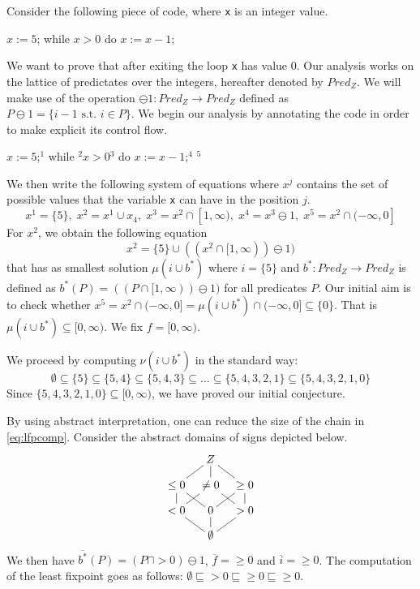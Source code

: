 \documentclass{llncs}
\begin{document}
Consider the following piece of code, where \texttt{x} is an integer value.
\begin{codeNT}
$x := 5$;  while $x>0$ do { $x:=x-1$; }
\end{codeNT}
We want to prove that after exiting the loop \texttt{x} has value $0$. Our analysis works on the lattice of predictates over the integers, hereafter denoted by $Pred_Z$. We will make use of the operation $\ominus 1 \colon Pred_Z \to Pred_Z$ defined as $P\ominus 1 = \{i-1 \text{ s.t. } i\in P  \}$. We begin our analysis by annotating the code in order to make explicit its control flow.
\begin{codeNT}
$x := 5$;$^{1}$  while $^{2}$$x>0$$^{3}$ do { $x:=x-1$;$^{4}$ }$^{5}$
\end{codeNT}
We then write the following system of equations where $x^j$ contains the set of possible values that the variable \texttt{x} can have in the position $j$.
\begin{equation}
x^1=\{5\},  \; x^2 = x^1\cup x_4, \; x^3 = x^2 \cap [1,\infty), \; x^4 = x^3 \ominus 1, \; x^5 = x^2 \cap (-\infty, 0]
\end{equation}
For $x^2$, we obtain the following equation
\begin{equation}
 x^2 = \{5\} \cup ( (x^2 \cap [1,\infty) ) \ominus 1 ) 
\end{equation}
that has as smallest solution $\mu (i \cup b^*)$ where $i=\{5\}$ and $b^*\colon Pred_Z \to Pred_Z$ is defined as $b^*(P) = ( (P\cap [1,\infty) ) \ominus 1 )$ for all predicates $P$. Our initial aim is to check whether $x^5 = x^2 \cap (-\infty, 0] = \mu (i \cup b^*)\cap (-\infty, 0]  \subseteq \{0\}$. That is $\mu (i \cup b^*)\subseteq [0,\infty)$. We fix $f = [0,\infty)$.

We proceed by computing $\nu (i \cup b^*)$ in the standard way:
\begin{equation}\label{eq:lfpcomp}
\emptyset \subseteq \{5\} \subseteq \{5,4\} \subseteq \{5,4,3\} \subseteq \dots \subseteq \{5,4,3,2,1\} \subseteq \{5,4,3,2,1,0\}
\end{equation}
Since $\{5,4,3,2,1,0\} \subseteq [0,\infty)$, we have proved our initial conjecture.

\medskip

By using abstract interpretation, one can reduce the size of the chain in  \eqref{eq:lfpcomp}. Consider the abstract domains of signs depicted below.
$$\xymatrix@R=0.3cm@C=0.3cm{ & Z &\\
\leq 0 \ar@{-}[ur]  & \neq 0 \ar@{-}[u]   &\geq 0 \ar@{-}[ul] \\
< 0 \ar@{-}[u] \ar@{-}[ur]  & 0 \ar@{-}[ur]\ar@{-}[ul]& > 0 \ar@{-}[ul]  \ar@{-}[u]\\
& \emptyset \ar@{-}[ur] \ar@{-}[ul] \ar@{-}[u]
 }$$
We then have $\overline{b^*}(P)= (P\sqcap >0)\ominus 1$, $\overline{f} = \geq 0$ and $\overline{i} =\geq 0$. The computation of the least fixpoint goes as follows:
$\emptyset \sqsubseteq >0 \sqsubseteq \geq 0 \sqsubseteq \geq 0$.
\end{document}
